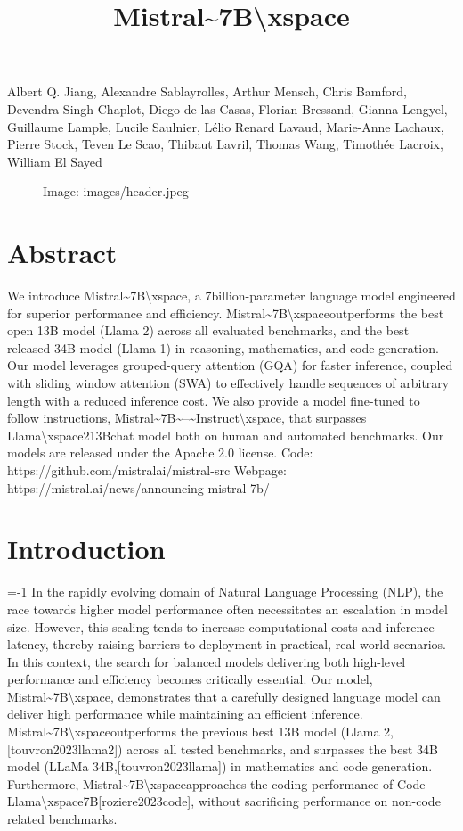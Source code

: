 \documentclass[11pt,a4paper]{article}
\title{Mistral\textasciitilde{}7B\textbackslash{}xspace}
\begin{document}
\maketitle

Albert Q. Jiang, Alexandre Sablayrolles, Arthur Mensch, Chris Bamford, Devendra Singh Chaplot, Diego de las Casas, Florian Bressand, Gianna Lengyel, Guillaume Lample, Lucile Saulnier, Lélio Renard Lavaud, Marie-Anne Lachaux, Pierre Stock, Teven Le Scao, Thibaut Lavril, Thomas Wang, Timothée Lacroix, William El Sayed

\begin{figure}[h]
\caption{Image: images/header.jpeg}
\end{figure}

\section{Abstract}

We introduce Mistral\textasciitilde{}7B\textbackslash{}xspace, a 7billion-parameter language model engineered for superior performance and efficiency. Mistral\textasciitilde{}7B\textbackslash{}xspaceoutperforms the best open 13B model (Llama 2) across all evaluated benchmarks, and the best released 34B model (Llama 1) in reasoning, mathematics, and code generation. Our model leverages grouped-query attention (GQA) for faster inference, coupled with sliding window attention (SWA) to effectively handle sequences of arbitrary length with a reduced inference cost. We also provide a model fine-tuned to follow instructions, Mistral\textasciitilde{}7B\textasciitilde{}--\textasciitilde{}Instruct\textbackslash{}xspace, that surpasses Llama\textbackslash{}xspace213Bchat model both on human and automated benchmarks. Our models are released under the Apache 2.0 license. Code: https://github.com/mistralai/mistral-src Webpage: https://mistral.ai/news/announcing-mistral-7b/

\section{Introduction}

=-1 In the rapidly evolving domain of Natural Language Processing (NLP), the race towards higher model performance often necessitates an escalation in model size. However, this scaling tends to increase computational costs and inference latency, thereby raising barriers to deployment in practical, real-world scenarios. In this context, the search for balanced models delivering both high-level performance and efficiency becomes critically essential. Our model, Mistral\textasciitilde{}7B\textbackslash{}xspace, demonstrates that a carefully designed language model can deliver high performance while maintaining an efficient inference. Mistral\textasciitilde{}7B\textbackslash{}xspaceoutperforms the previous best 13B model (Llama 2, [touvron2023llama2]) across all tested benchmarks, and surpasses the best 34B model (LLaMa 34B,[touvron2023llama]) in mathematics and code generation. Furthermore, Mistral\textasciitilde{}7B\textbackslash{}xspaceapproaches the coding performance of Code-Llama\textbackslash{}xspace7B[roziere2023code], without sacrificing performance on non-code related benchmarks.
\end{document}
